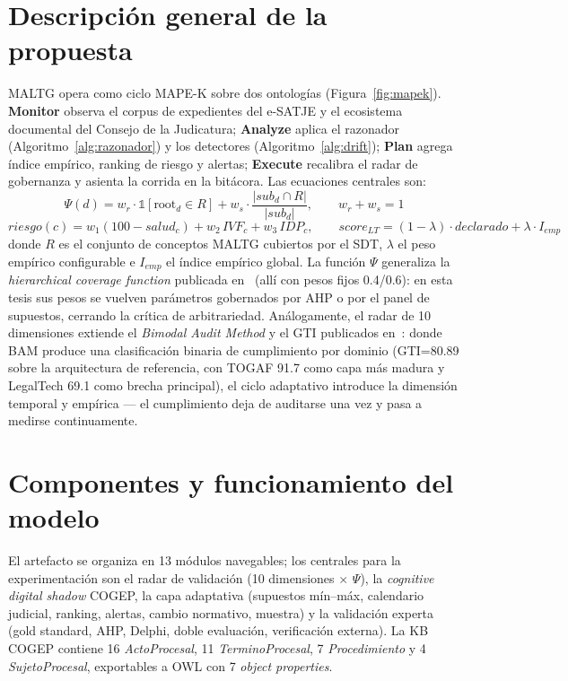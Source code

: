 \documentclass[a4paper,openany,12pt]{book}
\begin{document}
\section{Descripción general de la propuesta}
MALTG opera como ciclo MAPE-K sobre dos ontologías (Figura~\ref{fig:mapek}). \textbf{Monitor} observa el corpus de expedientes del e-SATJE y el ecosistema documental del Consejo de la Judicatura; \textbf{Analyze} aplica el razonador (Algoritmo~\ref{alg:razonador}) y los detectores (Algoritmo~\ref{alg:drift}); \textbf{Plan} agrega índice empírico, ranking de riesgo y alertas; \textbf{Execute} recalibra el radar de gobernanza y asienta la corrida en la bitácora. Las ecuaciones centrales son:
\begin{equation}
\Psi(d) = w_r\cdot\mathbb{1}[\text{root}_d\in R] + w_s\cdot\frac{|sub_d\cap R|}{|sub_d|},\qquad w_r+w_s=1
\end{equation}
\begin{equation}
riesgo(c) = w_1(100-salud_c) + w_2\,IVF_c + w_3\,IDP_c,\qquad
score_{LT} = (1-\lambda)\cdot declarado + \lambda\cdot I_{emp}
\end{equation}
donde $R$ es el conjunto de conceptos MALTG cubiertos por el SDT, $\lambda$ el peso empírico configurable e $I_{emp}$ el índice empírico global. La función $\Psi$ generaliza la \emph{hierarchical coverage function} publicada en~\cite{paccha2026info} (allí con pesos fijos 0.4/0.6): en esta tesis sus pesos se vuelven parámetros gobernados por AHP o por el panel de supuestos, cerrando la crítica de arbitrariedad. Análogamente, el radar de 10 dimensiones extiende el \textit{Bimodal Audit Method} y el GTI publicados en~\cite{paccha2026etcm}: donde BAM produce una clasificación binaria de cumplimiento por dominio (GTI=80.89 sobre la arquitectura de referencia, con TOGAF 91.7 como capa más madura y LegalTech 69.1 como brecha principal), el ciclo adaptativo introduce la dimensión temporal y empírica --- el cumplimiento deja de auditarse una vez y pasa a medirse continuamente.

\section{Componentes y funcionamiento del modelo}
El artefacto se organiza en 13 módulos navegables; los centrales para la experimentación son el radar de validación (10 dimensiones $\times$ $\Psi$), la \textit{cognitive digital shadow} COGEP, la capa adaptativa (supuestos mín--máx, calendario judicial, ranking, alertas, cambio normativo, muestra) y la validación experta (gold standard, AHP, Delphi, doble evaluación, verificación externa). La KB COGEP contiene 16 \textit{ActoProcesal}, 11 \textit{TerminoProcesal}, 7 \textit{Procedimiento} y 4 \textit{SujetoProcesal}, exportables a OWL con 7 \textit{object properties}.
\end{document}
